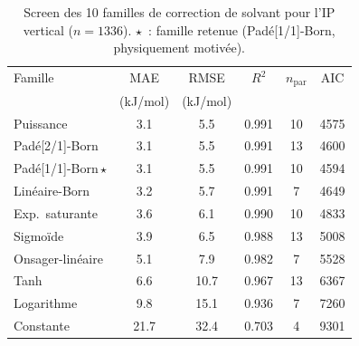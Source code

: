 \begin{table}[htbp]
\centering\footnotesize
\caption{Screen des 10 familles de correction de solvant pour l'IP vertical ($n=1336$). $\star$~: famille retenue (Padé[1/1]-Born, physiquement motivée).}
\label{tab:ms_ip_families}
\begin{tabular}{lccccc}
\toprule
Famille & MAE & RMSE & $R^2$ & $n_{\mathrm{par}}$ & AIC \\
 & (kJ/mol) & (kJ/mol) & & & \\
\midrule
Puissance & 3.1 & 5.5 & 0.991 & 10 & 4575 \\
Padé[2/1]-Born & 3.1 & 5.5 & 0.991 & 13 & 4600 \\
Padé[1/1]-Born\,$\star$ & 3.1 & 5.5 & 0.991 & 10 & 4594 \\
Linéaire-Born & 3.2 & 5.7 & 0.991 & 7 & 4649 \\
Exp.\ saturante & 3.6 & 6.1 & 0.990 & 10 & 4833 \\
Sigmoïde & 3.9 & 6.5 & 0.988 & 13 & 5008 \\
Onsager-linéaire & 5.1 & 7.9 & 0.982 & 7 & 5528 \\
Tanh & 6.6 & 10.7 & 0.967 & 13 & 6367 \\
Logarithme & 9.8 & 15.1 & 0.936 & 7 & 7260 \\
Constante & 21.7 & 32.4 & 0.703 & 4 & 9301 \\
\bottomrule
\end{tabular}
\end{table}